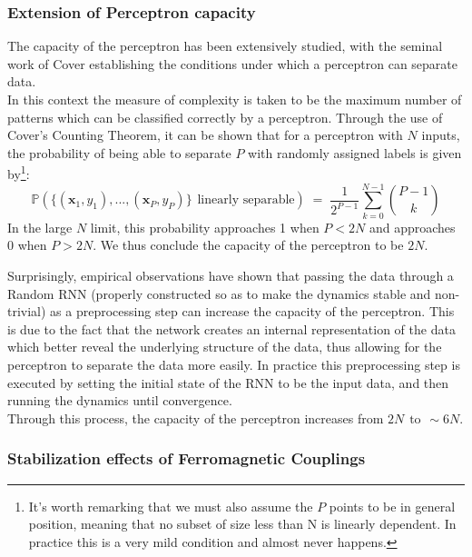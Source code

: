 \documentclass[a4paper,12pt]{report}
\begin{document}
\subsubsection*{Extension of Perceptron capacity}
The capacity of the perceptron has been extensively studied, with the seminal work of 
Cover \cite{Cover1965} establishing the conditions under which a perceptron can 
separate data.\\
In this context the measure of complexity is taken to be the maximum number of 
patterns which can be classified correctly by a perceptron. Through the use of 
Cover's Counting Theorem, it can be shown that for a perceptron with $N$ inputs, the 
probability of being able to separate $P$ with randomly assigned labels is given 
by\footnote{
    It's worth remarking that we must also assume the $P$ points to be in general position, meaning that
no subset of size less than N is linearly dependent. In practice this is a very mild condition and 
almost never happens.}:
\begin{equation}
  \mathbb{P}\left(\{ \left(\mathbf{x}_1, y_1 \right), \text{...}, 
  \left(\mathbf{x}_P, y_P \right)\} \hspace{5pt} \text{linearly separable}\right) \;=\; 
  \frac{1}{2^{P-1}} \sum_{k=0}^{N-1} \binom{P-1}{k}
\end{equation}
In the large $N$ limit, this probability approaches 1 when $P < 2N$ and approaches 0 when 
$P > 2N$. We thus conclude the capacity of the perceptron to be $2N$.

Surprisingly, empirical observations \cite{Student2024} have shown that passing the data through a 
Random RNN (properly constructed so as to make the dynamics stable and non-trivial) as a 
preprocessing step can increase the capacity of the perceptron. This is due to the fact that the 
network creates an internal representation of the data which better reveal the underlying structure 
of the data, thus allowing for the perceptron to separate the data more easily. In practice this 
preprocessing step is executed by setting the initial state of the RNN to be the input data, and 
then running the dynamics until convergence. \\
Through this process, the capacity of the perceptron increases from $2N \hspace{5pt} \text{to} 
\hspace{5pt} \sim 6N$.

\subsubsection*{Stabilization effects of Ferromagnetic Couplings}
\end{document}
